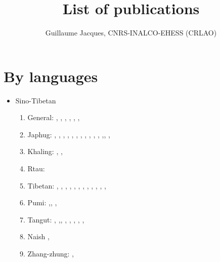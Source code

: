 \documentclass[oldfontcommands,oneside,a4paper,11pt]{article}
\begin{document}
 

  \title{List of publications}
 
\author{Guillaume Jacques, CNRS-INALCO-EHESS (CRLAO)}
\maketitle

 
\section{By languages}
\begin{itemize}
\item Sino-Tibetan
\begin{enumerate}
\item General: \citet{jacques03s.houzhui}, \citet{jacques06morpho}, \citet{jacques07chang}, \citet{antonov12kumush}, \citet{jacques12agreement},    \citet{michaud-jacques12nasalite},     
\item Japhug:  \citet{jacques04redupl},     \citet{jacques04these},   \citet{jacques07passif},  \citet{jacques07redupl}, \citet{jacques08},  \citet{jacques10gesar}, \citet{jacques10refl},  \citet{jacques10inverse},  \citet{jacques12incorp},   \citet{jacques12demotion},  \citet{jacques13harmonization},  \citet{jacques13tropative},\citet{jacques14antipassive}, \citet{japhug14ideophones}, \citet{jacques14inverse}  
\item Khaling: \citet{jacques12khaling},  \citet{jacques13derivational.khaling}, \citet{jacques14auditory}
\item Rtau: \citet{antonov14rtau}
\item Tibetan:  \citet{jacques01dg}, \citet{jacques04thimphu}, \citet{jacques07naksatram},      \citet{jacques08debther},  \citet{jacques09wazur}, \citet{jacques09e},  \citet{jacques10zos},   \citet{jacques10ndr},  \citet{jacques11lingua},  \citet{jacques12internal},  \citet{jacques12transcription}, \citet{jacques13yod}, \citet{jacques14snom}
\item Pumi:  \citet{michaud10bonin},\citet{jacques11pumi.tone}, \citet{jacques11lingua}, 
\item Tangut: \citet{jacques06comparaison},  \citet{jacques08weiyu},\citet{jacques08alternations},   \citet{jacques09tangutverb},  \citet{jacques10imperial},  \citet{jacques11tangut.verb}, \citet{jacques11ngwemi}, \citet{jacques11kinship},  \citet{jacques14esquisse}
\item Naish \citet{jacques.michaud11naish}, 
\item  Zhang-zhung: \citet{jacques09zz}, 

\end{enumerate}
\end{itemize}
\end{document}
